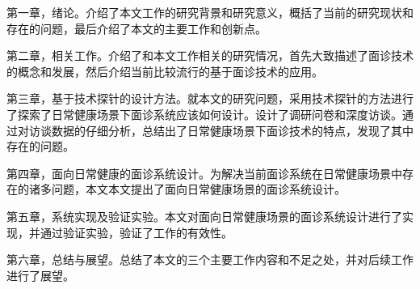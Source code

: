 第一章，绪论。介绍了本文工作的研究背景和研究意义，概括了当前的研究现状和存在的问题，最后介绍了本文的主要工作和创新点。

第二章，相关工作。介绍了和本文工作相关的研究情况，首先大致描述了面诊技术的概念和发展，然后介绍当前比较流行的基于面诊技术的应用。

第三章，基于技术探针的设计方法。就本文的研究问题，采用技术探针的方法进行了探索了日常健康场景下面诊系统应该如何设计。设计了调研问卷和深度访谈。通过对访谈数据的仔细分析，总结出了日常健康场景下面诊技术的特点，发现了其中存在的问题。

第四章，面向日常健康的面诊系统设计。为解决当前面诊系统在日常健康场景中存在的诸多问题，本文本文提出了面向日常健康场景的面诊系统设计。

第五章，系统实现及验证实验。本文对面向日常健康场景的面诊系统设计进行了实现，并通过验证实验，验证了工作的有效性。

第六章，总结与展望。总结了本文的三个主要工作内容和不足之处，并对后续工作进行了展望。